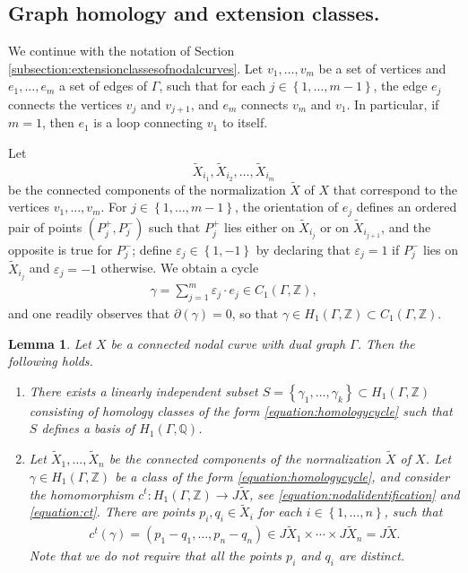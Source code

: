 \documentclass[a4paper,11pt,reqno]{amsart}
\numberwithin{equation}{section}
\theoremstyle{plain}
\newtheorem{lemma}[theorem]{Lemma}
\theoremstyle{definition}
\newcommand{\Z}{\mathbb Z}
\newcommand{\Q}{\mathbb Q}
\newcommand{\wt}[1]{{\widetilde{#1}}}
\newcommand{\set}[1]{\left\{ #1 \right\}}
\begin{document}
\subsection{Graph homology and extension classes.} We continue with the notation of Section \ref{subsection:extensionclassesofnodalcurves}. 
Let $v_1, \dotsc, v_m$ be a set of vertices and $e_1, \dotsc, e_{m}$ a set of edges of $\Gamma$, such that for each $j \in \set{1, \dotsc, m-1}$, the edge $e_j$ connects the vertices $v_j$ and $v_{j+1}$, and $e_m$ connects $v_m$ and $v_1$. In particular, if $m = 1$, then $e_1$ is a loop connecting $v_1$ to itself. 

Let $$\wt X_{i_1}, \wt X_{i_2}, \dotsc , \wt X_{i_m}$$ be the connected components of the normalization $\wt X$ of $X$ that correspond to the vertices $v_1, \dotsc, v_m$. For $j \in \set{1, \dotsc, m-1}$, the orientation of $e_j$ defines an ordered pair of points $(P_j^+, P_j^-)$ such that $P_j^+$ lies either on $\wt X_{i_j}$ or on $\wt X_{i_{j+1}}$, and the opposite is true for $P_j^-$; define $\varepsilon_j \in \set{1,-1}$ by declaring that $\varepsilon_j = 1$ if $P_j^-$ lies on $\wt X_{i_j}$ and $\varepsilon_j = -1$ otherwise. 
We obtain a cycle 
\begin{align} \label{equation:homologycycle}
\gamma = \sum_{j = 1}^m \varepsilon_j \cdot e_j \in C_1(\Gamma,\Z),
\end{align}
and one readily observes that $\partial(\gamma) = 0$, so that $\gamma\in H_1(\Gamma,\Z) \subset C_1(\Gamma,\Z)$. 

\begin{lemma} \label{lemma:basis:homology:suitable}
Let $X$ be a connected nodal curve with dual graph $\Gamma$. 
Then the following holds.
\begin{enumerate}
    \item There exists a linearly independent subset $S = \set{\gamma_1, \dotsc, \gamma_k} \subset H_1(\Gamma,\Z)$ consisting of homology classes of the form \eqref{equation:homologycycle} such that $S$ defines a basis of $H_1(\Gamma,\Q)$. \label{item:lemma:basis:homology:suitable}
    \item \label{item:lemma:alexeev1motif}
    Let $\wt X_1, \dotsc, \wt X_n$ be the connected components of the normalization $\wt X$ of $X$. 
Let $\gamma \in H_1(\Gamma,\Z)$ be a class of the form \eqref{equation:homologycycle}, and consider the homomorphism $c^t \colon H_1(\Gamma,\Z) \to J \wt X$, see \eqref{equation:nodalidentification} and \eqref{equation:ct}. 
There are points $p_{i}, q_i \in \wt X_i$ for each $i \in \set{1, \dotsc, n}$, such that
\begin{align} \label{equation:formct}
c^t(\gamma) = (p_{1} - q_{1}, \dotsc, p_{n} - q_{n}) \in J\wt X_1 \times \cdots \times J \wt X_n = J \wt X. 
\end{align} 
Note that we do not require that all the points $p_{i}$ and $q_{i}$ are distinct. 
\end{enumerate}
\end{lemma}
\end{document}
